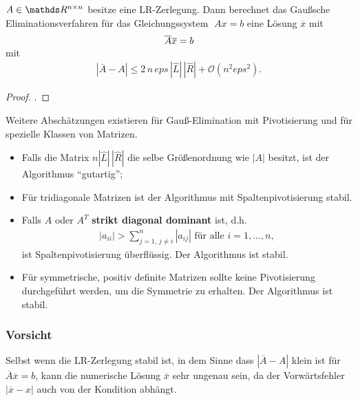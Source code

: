 \begin{Satze}[Sautter 1971]
  $ A \in \R^{n\times n}$ besitze eine LR-Zerlegung.  Dann berechnet das
  Gaußsche Eliminationsverfahren für das Gleichungssystem
  $\;  A  x =  b$ eine Lösung $\overline{ x}$ mit 
  \begin{gather*} \overline{ A} \overline{ x}  =   b \vspace*{-2ex} \end{gather*}
  mit
  \begin{gather*} 
    | \overline{ A} - A |  \leq  2 \, n \, eps \,
    |\hat{L}| \, | \hat{R}| + \mathcal{O}( n^2 eps^2).
  \end{gather*}
\end{Satze}

\begin{proof}
  \cite[siehe][]{deuflhardhohmann}.
\end{proof}

Weitere Abschätzungen existieren für Gauß-Elimination mit 
Pivotisierung und für spezielle Klassen von Matrizen.

\label{III.3.13}
\begin{itemize}
\item Falls die Matrix $n | \hat{ L} | \,  |\hat{ R}|$ die
  selbe Größenordnung wie $| A|$ besitzt, ist der
  Algorithmus \enquote{gutartig};
\item Für tridiagonale Matrizen  ist der Algorithmus mit
  Spaltenpivotisierung stabil.
\item Falls $ A$ oder $ A^T$  \textbf{strikt diagonal
    dominant} ist, d.h. 
  \begin{gather*}
    | a_{ii} | > \sum\limits_{j=1 ,\, j \not = i}^{n} | a_{ij}| 
    \mbox{ für alle } i = 1, \ldots, n,
  \end{gather*}
  ist Spaltenpivotisierung überflüssig. Der Algorithmus ist stabil.
\item Für symmetrische, positiv definite Matrizen sollte keine Pivotisierung
  durchgeführt werden, um die Symmetrie zu erhalten.
  Der Algorithmus ist stabil.
\end{itemize}

\subsubsection{Vorsicht}
Selbst wenn die LR-Zerlegung stabil ist, in dem Sinne dass
$| \overline{ A} - A|$ klein ist für
$ \overline{ A}\overline{ x}  =  b $, 
kann die numerische Lösung $\overline{ x}$ sehr
ungenau sein, da der Vorwärtsfehler $| \overline{ x} - {  x}| $ auch von der
Kondition abhängt.


